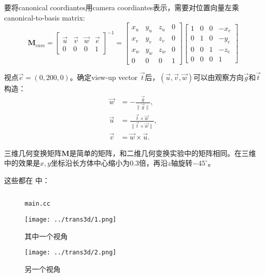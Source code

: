 \documentclass{cumtbrep}
\newcommand\inputcode[3][c++]{%
	\inputminted{#1}{#2}
	\begin{figure}[H]
		\centering
		\captionsetup{type=table}
		\caption{\texttt{#3}}
	\end{figure}
}
\begin{document}
要将canonical coordiantes用camera coordiantes表示，需要对位置向量左乘canonical-to-basis matrix:
\[
	\mathbf{M}_{\mathit{cam}}=
	\begin{bmatrix}
		\vec{u} & \vec{v} & \vec{w} & \vec{e} \\
		0 & 0 & 0 & 1
	\end{bmatrix}^{-1}=
	\begin{bmatrix}
		x_u & y_u & z_u & 0 \\
		x_v & y_v & z_v & 0 \\
		x_w & y_w & z_w & 0 \\
		0 & 0 & 0 & 1
	\end{bmatrix}
	\begin{bmatrix}
		1 & 0 & 0 & -x_e \\
		0 & 1 & 0 & -y_e \\
		0 & 0 & 1 & -z_e \\
		0 & 0 & 0 & 1
	\end{bmatrix}
\]

视点$\vec e = (0,200,0)$。确定view-up vector $\vec t$后，$(\vec u,\vec v,\vec w)$可以由观察方向$\vec g$和$\vec t$构造：
\begin{align*}
	\vec w &= - \frac{\vec g}{\|\vec g\|}, \\
	\vec u &= \frac{\vec t \times \vec w}{\|\vec t \times \vec w\|}, \\
	\vec v &= \vec w \times \vec u.
\end{align*}

三维几何变换矩阵$\mathbf{M}$是简单的矩阵，和二维几何变换实验中的矩阵相同。在三维中的效果是$x,y$坐标沿长方体中心缩小为$0.3$倍，再沿$z$轴旋转$-45^\circ$。

这些都在  中：
\inputcode{../trans3d/main.cc}{main.cc}

\analysesec
\begin{figure}[H]
	\centering
	\texttt{[image: ../trans3d/1.png]}
	\caption{其中一个视角}
\end{figure}
\begin{figure}[H]
	\centering
	\texttt{[image: ../trans3d/2.png]}
	\caption{另一个视角}
\end{figure}

\maketail
\end{document}
